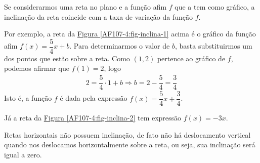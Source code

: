 Se considerarmos uma reta no plano e a função afim \(f\) que a tem como gráfico, a inclinação da reta coincide com a taxa de variação da função \(f\).

Por exemplo, a reta da \hyperref[AF107-4:fig-inclina-1]{Figura \ref{AF107-4:fig-inclina-1}} acima é o gráfico da função afim \(f(x)=\dfrac 54 x +b\). Para determinarmos o valor de \(b\), basta substituirmos um dos pontos que estão sobre a reta. Como \((1,2)\) pertence ao gráfico de \(f\), podemos afirmar que \(f(1)=2\), logo
\begin{equation*}
\begin{split}2=\dfrac 54 \cdot 1 + b \Longrightarrow b=2-\dfrac 54 = \dfrac 34\end{split}
\end{equation*}
Isto é, a função \(f\) é dada pela expressão \(f(x)=\dfrac 54 x + \dfrac 34\).

Já a reta da \hyperref[AF107-4:fig-inclina-2]{Figura \ref{AF107-4:fig-inclina-2}} tem expressão \(f(x)=-3x\).

Retas horizontais não possuem inclinação, de fato não há deslocamento vertical quando nos deslocamos horizontalmente sobre a reta, ou seja, sua inclinação será igual a zero.

